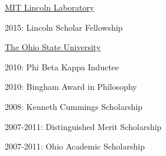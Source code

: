 \halfblankline

\href{http://www.ll.mit.edu}{MIT Lincoln Laboratory}
\begin{innerlist}
  \item[] 2015: Lincoln Scholar Fellowship
\end{innerlist}

\halfblankline

\href{http://www.osu.edu}{The Ohio State University}
\begin{innerlist}
  \item[] 2010: Phi Beta Kappa Inductee
  \item[] 2010: Bingham Award in Philosophy
  \item[] 2008: Kenneth Cummings Scholarship
  \item[] 2007-2011: Distinguished Merit Scholarship
  \item[] 2007-2011: Ohio Academic Scholarship
\end{innerlist}

